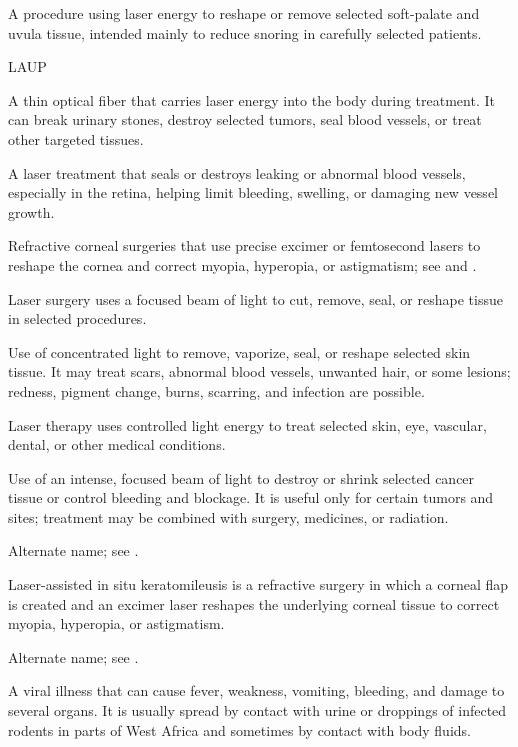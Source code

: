  A procedure using laser energy to reshape or remove selected soft-palate and uvula tissue, intended mainly to reduce snoring in carefully selected patients.

\synonyms
LAUP

 A thin optical fiber that carries laser energy into the body during treatment. It can break urinary stones, destroy selected tumors, seal blood vessels, or treat other targeted tissues.

 A laser treatment that seals or destroys leaking or abnormal blood vessels, especially in the retina, helping limit bleeding, swelling, or damaging new vessel growth.

 Refractive corneal surgeries that use precise excimer or femtosecond lasers to reshape the cornea and correct myopia, hyperopia, or astigmatism; see  and .

 Laser surgery uses a focused beam of light to cut, remove, seal, or reshape tissue in selected procedures.

 Use of concentrated light to remove, vaporize, seal, or reshape selected skin tissue. It may treat scars, abnormal blood vessels, unwanted hair, or some lesions; redness, pigment change, burns, scarring, and infection are possible.

 Laser therapy uses controlled light energy to treat selected skin, eye, vascular, dental, or other medical conditions.

 Use of an intense, focused beam of light to destroy or shrink selected cancer tissue or control bleeding and blockage. It is useful only for certain tumors and sites; treatment may be combined with surgery, medicines, or radiation.

 Alternate name; see .

 Laser-assisted in situ keratomileusis is a refractive surgery in which a corneal flap is created and an excimer laser reshapes the underlying corneal tissue to correct myopia, hyperopia, or astigmatism.

 Alternate name; see .

 A viral illness that can cause fever, weakness, vomiting, bleeding, and damage to several organs. It is usually spread by contact with urine or droppings of infected rodents in parts of West Africa and sometimes by contact with body fluids.

